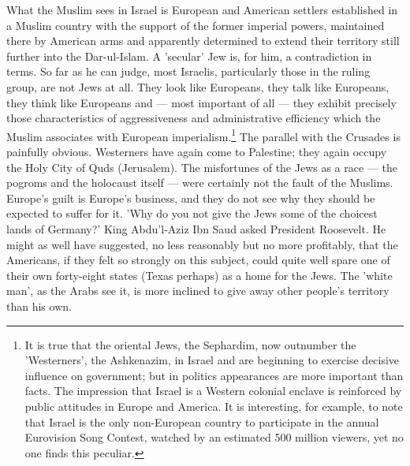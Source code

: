 \documentclass[10pt, twoside]{book}
\begin{document}
What the Muslim sees in Israel is European and American settlers established in a Muslim country with the support of the former imperial powers, maintained there by American arms and apparently determined to extend their territory still further into the Dar\hyp{}ul\hyp{}Islam. A 'secular' Jew is, for him, a contradiction in terms. So far as he can judge, most Israelis, particularly those in the ruling group, are not Jews at all. They look like Europeans, they talk like Europeans, they think like Europeans and --- most important of all --- they exhibit precisely those characteristics of aggressiveness and administrative efficiency which the Muslim associates with European imperialism.\footnote{It is true that the oriental Jews, the Sephardim, now outnumber the 'Westerners', the Ashkenazim, in Israel and are beginning to exercise decisive influence on government; but in politics appearances are more important than facts. The impression that Israel is a Western colonial enclave is reinforced by public attitudes in Europe and America. It is interesting, for example, to note that Israel is the only non\hyp{}European country to participate in the annual Eurovision Song Contest, watched by an estimated 500 million viewers, yet no one finds this peculiar.} The parallel with the Crusades is painfully obvious. Westerners have again come to Palestine; they again occupy the Holy City of Quds (Jerusalem). The misfortunes of the Jews as a race --- the pogroms and the holocaust itself --- were certainly not the fault of the Muslims. Europe's guilt is Europe's business, and they do not see why they should be expected to suffer for it. 'Why do you not give the Jews some of the choicest lands of Germany?' King Abdu'l\hyp{}Aziz Ibn Saud asked President Roosevelt. He might as well have suggested, no less reasonably but no more profitably, that the Americans, if they felt so strongly on this subject, could quite well spare one of their own forty\hyp{}eight states (Texas perhaps) as a home for the Jews. The 'white man', as the Arabs see it, is more inclined to give away other people's territory than his own. \\
\end{document}
